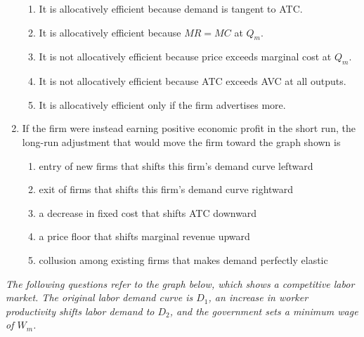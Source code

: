 \documentclass[10pt]{article}
\newenvironment{choiceslist}
  {\begin{enumerate}[label=(\Alph*), leftmargin=1.55em, itemsep=0.1em, topsep=0.15em, parsep=0pt]}
  {\end{enumerate}}
\newenvironment{stimulus}
  {\begin{center}\begin{minipage}{0.97\columnwidth}\footnotesize\itshape\setlength{\tabcolsep}{3pt}\renewcommand{\arraystretch}{0.96}}
  {\end{minipage}\end{center}}
\begin{document}
\begin{multicols*}{2}
\begin{enumerate}[resume*=curveq, leftmargin=*, itemsep=0.8em, topsep=0.18em, parsep=0pt]
\begin{choiceslist}
\item It is allocatively efficient because demand is tangent to ATC.
\item It is allocatively efficient because $MR=MC$ at $Q_m$.
\item It is not allocatively efficient because price exceeds marginal cost at $Q_m$.
\item It is not allocatively efficient because ATC exceeds AVC at all outputs.
\item It is allocatively efficient only if the firm advertises more.
\end{choiceslist}
\item If the firm were instead earning positive economic profit in the short run, the long-run adjustment that would move the firm toward the graph shown is
\begin{choiceslist}
\item entry of new firms that shifts this firm's demand curve leftward
\item exit of firms that shifts this firm's demand curve rightward
\item a decrease in fixed cost that shifts ATC downward
\item a price floor that shifts marginal revenue upward
\item collusion among existing firms that makes demand perfectly elastic
\end{choiceslist}
\end{enumerate}
\begin{stimulus}
The following questions refer to the graph below, which shows a competitive labor market. The original labor demand curve is $D_1$, an increase in worker productivity shifts labor demand to $D_2$, and the government sets a minimum wage of $W_m$.


\end{stimulus}
\end{multicols*}
\end{document}
